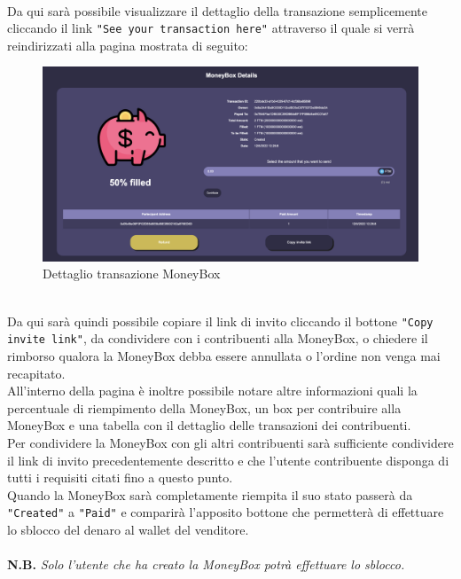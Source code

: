             \textbf{}\\
            Da qui sarà possibile visualizzare il dettaglio della transazione semplicemente cliccando il link \texttt{"See your transaction here"} attraverso il quale si verrà reindirizzati alla pagina mostrata di seguito:
            \begin{figure}[H]
                \centering
                \includegraphics[scale=0.2]{immagini/Checkout/MoneyBoxDetails.png}
                \caption{Dettaglio transazione MoneyBox}
            \end{figure}
            \textbf{}\\
            Da qui sarà quindi possibile copiare il link di invito cliccando il bottone \texttt{"Copy invite link"}, da condividere con i contribuenti alla MoneyBox, o chiedere il rimborso qualora la MoneyBox debba essere annullata o l'ordine non venga mai recapitato.\\
            All'interno della pagina è inoltre possibile notare altre informazioni quali la percentuale di riempimento della MoneyBox, un box per contribuire alla MoneyBox e una tabella con il dettaglio delle transazioni dei contribuenti.\\
            Per condividere la MoneyBox con gli altri contribuenti sarà sufficiente condividere il link di invito precedentemente descritto e che l'utente contribuente disponga di tutti i requisiti citati fino a questo punto.\\
            Quando la MoneyBox sarà completamente riempita il suo stato passerà da \texttt{"Created"} a \texttt{"Paid"} e comparirà l'apposito bottone che permetterà di effettuare lo sblocco del denaro al wallet del venditore.\\\\ 
            \textbf{N.B.} \textit{Solo l'utente che ha creato la MoneyBox potrà effettuare lo sblocco.}\\\\
